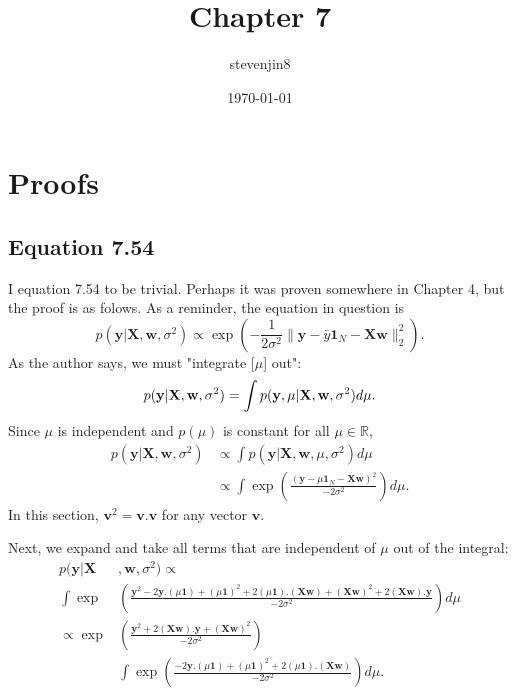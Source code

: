 \documentclass[a4paper,11pt]{article}
\title{Chapter 7}
\author{stevenjin8}
\date{\today}
\begin{document}
\maketitle
\section*{Proofs}
\subsection*{Equation 7.54}
I equation 7.54 to be trivial.  Perhaps it was proven somewhere in Chapter 4, but the proof is as
folows.  As a reminder, the equation in question is
\[
    p(\mathbf{y}|\mathbf{X}, \mathbf{w}, \sigma^2)
	\propto \exp(-\frac{1}{2\sigma^2}\lVert\mathbf{y} - \bar{y}\mathbf{1}_N - \mathbf{Xw}\rVert_2^2).
\]
As the author says, we must "integrate [$\mu$] out":
\[
    p(\mathbf{y}|\mathbf{X}, \mathbf{w}, \sigma^2) = 
	\int p(\mathbf{y},\mu|\mathbf{X}, \mathbf{w}, \sigma^2) d\mu.\\
\]
Since $\mu$ is independent and $p(\mu)$ is constant for all $\mu \in \mathbb{R}$,
\begin{align*}
	p(\mathbf{y}|\mathbf{X}, \mathbf{w}, \sigma^2) & \propto
	\int p(\mathbf{y}|\mathbf{X}, \mathbf{w}, \mu, \sigma^2)d\mu \\
	& \propto \int\exp\left(\frac{
		\left(\mathbf{y} - \mu\mathbf{1}_N -\mathbf{Xw}\right)^2 
	}{-2\sigma^2}\right)d\mu.
\end{align*}
In this section, $\mathbf{v}^2 = \mathbf{v}.\mathbf{v}$ for any vector $\mathbf{v}$.

Next, we expand and take all terms that are independent of $\mu$ out of the
integral:
\begin{align*}
	p(\mathbf{y}|\mathbf{X}&, \mathbf{w}, \sigma^2) \propto \\
	\int\exp&\left(
		\frac{\mathbf{y}^2 - 2\mathbf{y} . (\mu\mathbf{1})
		+ (\mu\mathbf{1})^2 + 2(\mu\mathbf{1}) . (\mathbf{Xw})
		+ (\mathbf{Xw})^2 + 2(\mathbf{Xw}) . \mathbf{y}} {-2\sigma^2}
	\right) d\mu \\
	\propto \exp &\left(
		\frac{\mathbf{y}^2 + 2(\mathbf{Xw}).\mathbf{y} + (\mathbf{Xw})^2}{-2\sigma^2}
	\right) \\
	&\int\exp\left(
		\frac{-2\mathbf{y}.(\mu\mathbf{1}) + (\mu\mathbf{1})^2 + 2
		(\mu\mathbf{1}).(\mathbf{Xw})}
		{-2\sigma^2}
	\right)d\mu.
\end{align*}
\end{document}
